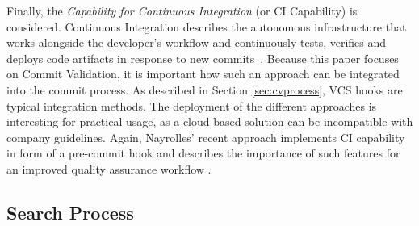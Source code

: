 Finally, the \textit{Capability for Continuous Integration} (or CI Capability) is considered. Continuous Integration describes the autonomous infrastructure that works alongside the developer's workflow and continuously tests, verifies and deploys code artifacts in response to new commits~\cite{booch1991object}.
Because this paper focuses on Commit Validation, it is important how such an approach can be integrated into the commit process. As described in Section \ref{sec:cvprocess}, VCS hooks are typical integration methods. The deployment of the different approaches is interesting for practical usage, as a cloud based solution can be incompatible with company guidelines. Again, Nayrolles' recent approach implements CI capability in form of a pre-commit hook and describes the importance of such features for an improved quality assurance workflow \cite{Nayrolles2018}.


\subsection{Search Process}
\label{sec:searchprocess}


